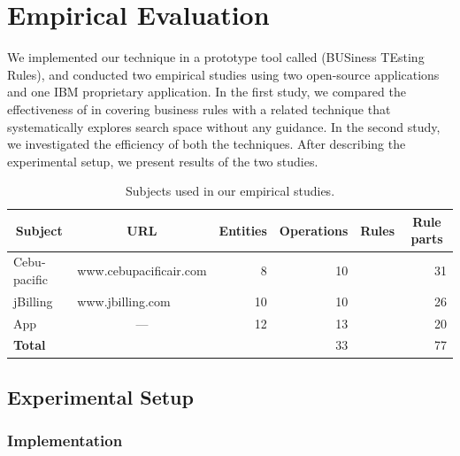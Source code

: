 \section{Empirical Evaluation}
\label{sec:eval}

We implemented our technique in a prototype tool called \tool{} (BUSiness TEsting Rules),
and conducted two empirical studies using two open-source applications 
and one IBM proprietary application. In the first study, we compared
the effectiveness of \tool{} in covering business rules with 
a related technique that systematically explores search space 
without any guidance. In the second study, we investigated the efficiency
of both the techniques. After describing the experimental setup,
we present results of the two studies.

\begin{table}[t]
\caption{Subjects used in our empirical studies.}
\centering
{\scriptsize
\tabcolsep=3pt
\begin{tabular}{|l|l|r|r|r|r|}
\hline
\multicolumn{1}{|c|}{Subject} & \multicolumn{1}{|c|}{URL} & \multicolumn{1}{|c|}{Entities} & \multicolumn{1}{|c|}{Operations} & \multicolumn{1}{|c|}{Rules} & \multicolumn{1}{|c|}{Rule parts} \\
\hline \hline
Cebu-pacific & www.cebupacificair.com 		& 8  & 10 &  	 & 31 \\
jBilling 		 & www.jbilling.com 					& 10 & 10 &   	 & 26 \\
App 				 & \multicolumn{1}{|c|}{---}	& 12 & 13 &     & 20 \\
\hline \hline
\textbf{Total} & 													& 	 & 33 &     & 77 \\
\hline
\end{tabular}
}
\label{tab:subjects}
\end{table}


\subsection{Experimental Setup}

\subsubsection{Implementation}
\label{sec:impl}

